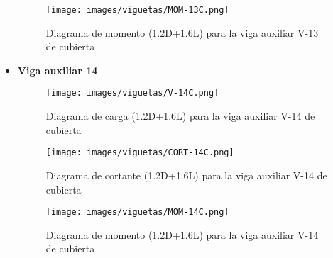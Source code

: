 \begin{itemize}
            \begin{figure}[H]
                \centering
                \texttt{[image: images/viguetas/MOM-13C.png]}
                \caption{Diagrama de momento (1.2D+1.6L) para la viga auxiliar V-13 de cubierta}
                \label{fig:Mom V-13 EP}
            \end{figure}
            
            \item \textbf{Viga auxiliar 14}\\
            \begin{figure}[H]
                \centering
                \texttt{[image: images/viguetas/V-14C.png]}
                \caption{Diagrama de carga (1.2D+1.6L) para la viga auxiliar V-14 de cubierta}
                \label{fig:W V-14 EP}
            \end{figure}
            
            \begin{figure}[H]
                \centering
                \texttt{[image: images/viguetas/CORT-14C.png]}
                \caption{Diagrama de cortante (1.2D+1.6L) para la viga auxiliar V-14 de cubierta}
                \label{fig:Cort V-14 EP}
            \end{figure}
            
            \begin{figure}[H]
                \centering
                \texttt{[image: images/viguetas/MOM-14C.png]}
                \caption{Diagrama de momento (1.2D+1.6L) para la viga auxiliar V-14 de cubierta}
                \label{fig:Mom V-14 EP}
            \end{figure}
            
\end{itemize}
